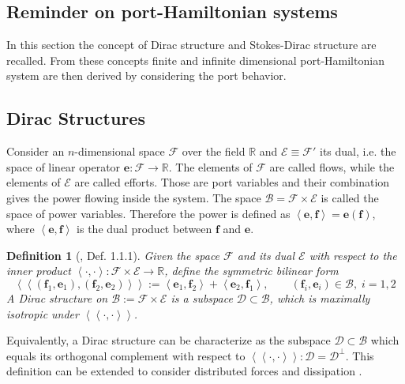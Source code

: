 \documentclass[preprint,12pt]{elsarticle}
\newcommand{\RevOne}[1]{\textcolor{blue!80!black}{#1}}
\newtheorem{definition}{Definition}
\begin{document}
\RevOne{
\section{Reminder on port-Hamiltonian systems}
In this section the concept of Dirac structure and Stokes-Dirac structure are recalled. From these concepts finite and infinite dimensional port-Hamiltonian system are then derived by considering the port behavior. 
\subsection{Dirac Structures}
Consider an $n$-dimensional space $\mathcal{F}$ over the field $\mathbb{R}$ and $\mathcal{E} \equiv \mathcal{F}'$ its dual, i.e. the space of linear operator $\bm{e} : \mathcal{F} \rightarrow \mathbb{R}$. The elements of $\mathcal{F}$ are called flows, while the elements of $\mathcal{E}$ are called efforts. Those are port variables and their combination gives the power flowing inside the system. The space $\mathcal{B} = \mathcal{F} \times \mathcal{E}$ is called the space of power variables. Therefore the power is defined as  $\left\langle \bm{e}, \bm{f} \right\rangle = \bm{e}(\bm{f})$, where $\left\langle \bm{e} , \bm{f} \right\rangle$ is the dual product between $\bm{f}$ and $\bm{e}$.
\begin{definition}[\cite{CourantDiracStructure}, Def. 1.1.1]
	Given the space $\mathcal{F}$ and its dual $\mathcal{E}$ with respect to the inner product $\left\langle \cdot , \cdot \right\rangle : \mathcal{F} \times \mathcal{E} \rightarrow \mathbb{R}$, define the symmetric bilinear form
	\begin{equation}
	\left\langle \left\langle (\bm{f}_1, \bm{e}_1), (\bm{f}_2, \bm{e}_2) \right\rangle \right\rangle := \left\langle \bm{e}_1, \bm{f}_2 \right\rangle +  \left\langle \bm{e}_2, \bm{f}_1 \right\rangle, \qquad (\bm{f}_i, \bm{e}_i) \in \mathcal{B}, \; i = 1, 2
	\end{equation}
	A Dirac structure on $\mathcal{B} := \mathcal{F} \times \mathcal{E}$ is a subspace $\mathcal{D} \subset \mathcal{B}$, which is maximally isotropic under $\left\langle \left\langle \cdot, \cdot \right\rangle \right\rangle$. 
\end{definition}
Equivalently, a Dirac structure can be characterize as the subspace $\mathcal{D} \subset \mathcal{B}$ which equals its orthogonal complement with respect to $\left\langle \left\langle \cdot, \cdot \right\rangle \right\rangle: \mathcal{D} =\mathcal{D}^\perp$. This definition can be extended to consider distributed forces and dissipation \cite{Villegas}.
}
\end{document}
